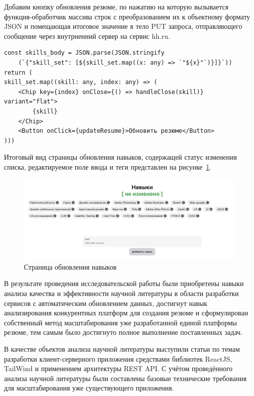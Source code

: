 \documentclass[master, och, pract]{SCWorks}
\begin{document}
Добавим кнопку обновления резюме, по нажатию на которую вызывается функция-обработчик массива строк с преобразованием их к объектному формату JSON и помещающая итоговое значение в тело PUT запроса, отправляющего сообщение через внутрненний сервер на сервис hh.ru.
\begin{verbatim}
const skills_body = JSON.parse(JSON.stringify
    (`{"skill_set": [${skill_set.map((x: any) => `"${x}"`)}]}`))
return (
skill_set.map((skill: any, index: any) => (
    <Chip key={index} onClose={() => handleClose(skill)} variant="flat">
        {skill}
    </Chip>
    <Button onClick={updateResume}>Обновить резюме</Button>
)))
\end{verbatim}

Итоговый вид страницы обновления навыков, содержащей статус изменения списка, редактируемое поле ввода и теги представлен на рисунке~\ref{fig:6}. 
\begin{figure}[!ht]
    \centering
    \includegraphics[width=12cm]{images/image-update-skills.png}
    \caption{\label{fig:6}%
        Страница обновления навыков}
\end{figure}





\newpage
\conclusion
В результате проведения исследовательской работы были приобретены навыки анализа качества и эффективности научной литературы в области разработки сервисов с автоматическим обновлением данных, достигнут навык анализирования конкурентных платформ для создания резюме и сформулирован собственный метод масштабирования уже разработанной единой платформы резюме, тем самым было достигнуто полное выполнение поставленных задач. 

В качестве объектов анализа научной литературы выступили статьи по темам разработки клиент-серверного приложения средствами библиотек ReactJS, TailWind и применением архитектуры REST API. С учётом проведённого анализа научной литературы были составлены базовые технические требования для масштабирования уже существующего приложения.
\end{document}
